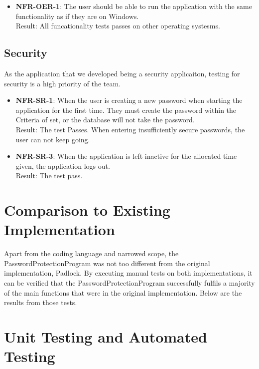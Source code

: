 \documentclass[12pt, titlepage]{article}
\begin{document}
		\begin{itemize}
			
			\item \textbf{NFR-OER-1}: The user should be able to run the application with the same functionality as if they are on Windows.\\
			Result: All funcationality tests passes on other operating systesms. 

		\end{itemize}

	\subsection{Security}
		As the application that we developed being a security applicaiton, testing for security is a high priority of the team.
	
		\begin{itemize}
			
			\item \textbf{NFR-SR-1}: When the user is creating a new password when starting the application for the first time. They must create the password within the Criteria of set, or the database will not take the password.\\
			Result: The test Passes. When entering insufficiently secure passwords, the user can not keep going.

			\item \textbf{NFR-SR-3}: When the application is left inactive for the allocated time given, the application logs out.\\
			Result: The test pass.

		\end{itemize}
	
\section{Comparison to Existing Implementation}	

Apart from the coding language and narrowed scope, the PasswordProtectionProgram was not too different from the original implementation, Padlock. By executing manual tests on both implementations, it can be verified that the PasswordProtectionProgram successfully fulfils a majority of the main functions that were in the original implementation. Below are the results from those tests.

\section{Unit Testing and Automated Testing}
\end{document}
